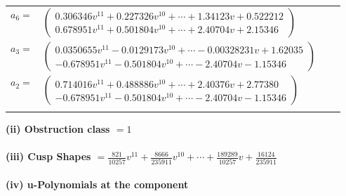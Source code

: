 \documentclass[1p]{elsarticle_modified}
\theoremstyle{definition}
\begin{document}
\begin{tabular}{m{7pt} m{180pt} m{7pt} m{180pt} }
\flushright $a_{6}=$&$\begin{pmatrix}0.306346 v^{11}+0.227326 v^{10}+\cdots+1.34123 v+0.522212\\0.678951 v^{11}+0.501804 v^{10}+\cdots+2.40704 v+2.15346\end{pmatrix}$ \\
\flushright $a_{3}=$&$\begin{pmatrix}0.0350655 v^{11}-0.0129173 v^{10}+\cdots-0.00328231 v+1.62035\\-0.678951 v^{11}-0.501804 v^{10}+\cdots-2.40704 v-1.15346\end{pmatrix}$ \\
\flushright $a_{2}=$&$\begin{pmatrix}0.714016 v^{11}+0.488886 v^{10}+\cdots+2.40376 v+2.77380\\-0.678951 v^{11}-0.501804 v^{10}+\cdots-2.40704 v-1.15346\end{pmatrix}$\\&\end{tabular}
\flushleft \textbf{(ii) Obstruction class $= 1$}\\~\\
\flushleft \textbf{(iii) Cusp Shapes $= \frac{821}{10257} v^{11}+\frac{8666}{235911} v^{10}+\cdots+\frac{189289}{10257} v+\frac{16124}{235911}$}\\~\\
\newpage\renewcommand{\arraystretch}{1}
\flushleft \textbf{(iv) u-Polynomials at the component}\newline \\
\end{document}
